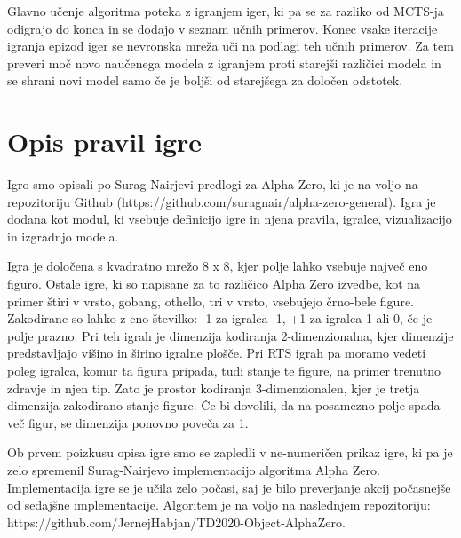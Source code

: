 \documentclass[a4paper, 12pt]{book}
\begin{document}
Glavno učenje algoritma poteka z igranjem iger, ki pa se za razliko od MCTS-ja odigrajo do konca in se dodajo v seznam učnih primerov.
Konec vsake iteracije igranja epizod iger se nevronska mreža uči na podlagi teh učnih primerov.
Za tem preveri moč novo naučenega modela z igranjem proti starejši različici modela in se shrani novi model samo če je boljši od starejšega za določen odstotek.

\chapter{Opis pravil igre}
\label{chpravilaigre}

Igro smo opisali po Surag Nairjevi predlogi za Alpha Zero, ki je na voljo na repozitoriju Github (https://github.com/suragnair/alpha-zero-general).
Igra je dodana kot modul, ki vsebuje definicijo igre in njena pravila, igralce, vizualizacijo in izgradnjo modela.

Igra je določena s kvadratno mrežo 8 x 8, kjer polje lahko vsebuje največ eno figuro.
Ostale igre, ki so napisane za to različico Alpha Zero izvedbe, kot na primer štiri v vrsto, gobang, othello, tri v vrsto, vsebujejo črno-bele figure.
Zakodirane so lahko z eno številko: -1 za igralca -1, +1 za igralca 1 ali 0, če je polje prazno.
Pri teh igrah je dimenzija kodiranja 2-dimenzionalna, kjer dimenzije predstavljajo višino in širino igralne plošče.
Pri RTS igrah pa moramo vedeti poleg igralca, komur ta figura pripada, tudi stanje te figure, na primer trenutno zdravje in njen tip.
Zato je prostor kodiranja 3-dimenzionalen, kjer je tretja dimenzija zakodirano stanje figure.
Če bi dovolili, da na posamezno polje spada več figur, se dimenzija ponovno poveča za 1.

Ob prvem poizkusu opisa igre smo se zapledli v ne-numeričen prikaz igre, ki pa je zelo spremenil Surag-Nairjevo implementacijo algoritma Alpha Zero.
Implementacija igre se je učila zelo počasi, saj je bilo preverjanje akcij počasnejše od sedajšne implementacije.
Algoritem je na voljo na naslednjem repozitoriju:\\
https://github.com/JernejHabjan/TD2020-Object-AlphaZero.
\end{document}

